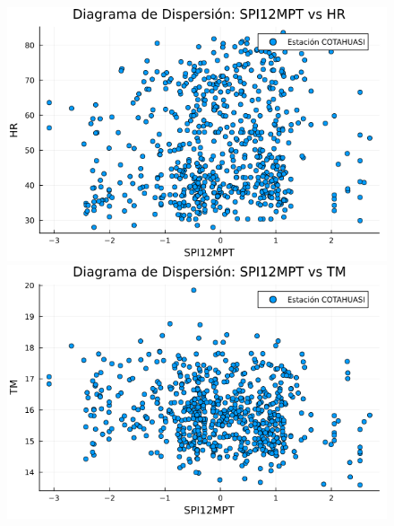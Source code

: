 \begin{figure}[htbp]
\vspace{0.5cm}  %

\begin{minipage}{0.32\textwidth}
    \centering
    \includegraphics[width=\linewidth]{Capitulos/Scaterplot/COTAHUASI_SPI12MPT_vs_HR.png}
\end{minipage}\hfill
\begin{minipage}{0.32\textwidth}
    \centering
    \includegraphics[width=\linewidth]{Capitulos/Scaterplot/COTAHUASI_SPI12MPT_vs_TM.png}
\end{minipage}\hfill
\begin{minipage}{0.32\textwidth}
    \centering

\end{minipage}
\end{figure}
